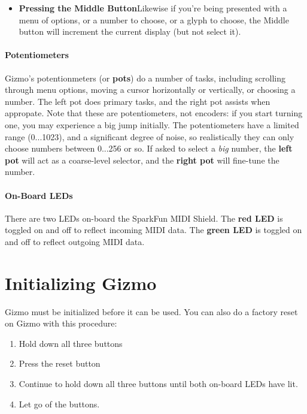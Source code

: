 \documentclass{article}
\begin{document}
\begin{itemize}
\item {\bf Pressing the Middle Button}\quad Likewise if you're being presented with a menu of options, or a number to choose, or a glyph to choose, the Middle button will increment the current display (but not select it). 
\end{itemize}

\paragraph{Potentiometers}

Gizmo's potentionmeters  (or {\bf pots}) do a number of tasks, including scrolling through menu options, moving a cursor horizontally or vertically, or choosing a number.  The left pot does primary tasks, and the right pot assists when appropate.  Note that these are potentiometers, not encoders: if you start turning one, you may experience a big jump initially.  The potentiometers have a limited range (0...1023), and a significant degree of noise, so realistically they can only choose numbers between 0...256 or so.  If asked to select a {\it big} number, the {\bf left pot} will act as a coarse-level selector, and the {\bf right pot} will fine-tune the number.


\paragraph{On-Board LEDs}

There are two LEDs on-board the SparkFun MIDI Shield.  The {\bf red LED} is toggled on and off to reflect incoming MIDI data.  The {\bf green LED} is toggled on and off to reflect outgoing MIDI data.  

\section{Initializing Gizmo}

Gizmo must be initialized before it can be used.  You can also do a factory reset on Gizmo with this procedure:

\begin{enumerate}
\item Hold down all three buttons
\item Press the reset button
\item Continue to hold down all three buttons until both on-board LEDs have lit.
\item Let go of the buttons.
\end{enumerate}
\end{document}
